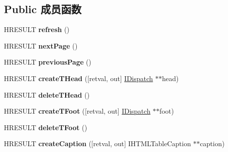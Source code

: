 \subsection*{Public 成员函数}
\begin{DoxyCompactItemize}
\item 
\mbox{\label{interface_m_s_h_t_m_l_1_1_i_h_t_m_l_table_ac39968febc365277fe7c73e6e901bcf8}} 
H\+R\+E\+S\+U\+LT {\bfseries refresh} ()
\item 
\mbox{\label{interface_m_s_h_t_m_l_1_1_i_h_t_m_l_table_ae88268dc0a4544631b9298c2079a12b6}} 
H\+R\+E\+S\+U\+LT {\bfseries next\+Page} ()
\item 
\mbox{\label{interface_m_s_h_t_m_l_1_1_i_h_t_m_l_table_af849179dec19fefd06c335a8835f4393}} 
H\+R\+E\+S\+U\+LT {\bfseries previous\+Page} ()
\item 
\mbox{\label{interface_m_s_h_t_m_l_1_1_i_h_t_m_l_table_a46320a94a853653b369bd81836d4bafc}} 
H\+R\+E\+S\+U\+LT {\bfseries create\+T\+Head} (\mbox{[}retval, out\mbox{]} \hyperlink{interface_i_dispatch}{I\+Dispatch} $\ast$$\ast$head)
\item 
\mbox{\label{interface_m_s_h_t_m_l_1_1_i_h_t_m_l_table_a06da2a6866d3edc3dcb2932920fa865e}} 
H\+R\+E\+S\+U\+LT {\bfseries delete\+T\+Head} ()
\item 
\mbox{\label{interface_m_s_h_t_m_l_1_1_i_h_t_m_l_table_ac856bf587b2179f9d39bb2b800377630}} 
H\+R\+E\+S\+U\+LT {\bfseries create\+T\+Foot} (\mbox{[}retval, out\mbox{]} \hyperlink{interface_i_dispatch}{I\+Dispatch} $\ast$$\ast$foot)
\item 
\mbox{\label{interface_m_s_h_t_m_l_1_1_i_h_t_m_l_table_ae0c9b5b9cab968ea5f5ab820a3381806}} 
H\+R\+E\+S\+U\+LT {\bfseries delete\+T\+Foot} ()
\item 
\mbox{\label{interface_m_s_h_t_m_l_1_1_i_h_t_m_l_table_a03696ea496e4e87302d093f72d570887}} 
H\+R\+E\+S\+U\+LT {\bfseries create\+Caption} (\mbox{[}retval, out\mbox{]} I\+H\+T\+M\+L\+Table\+Caption $\ast$$\ast$caption)
$$
\end{DoxyCompactItemize}
